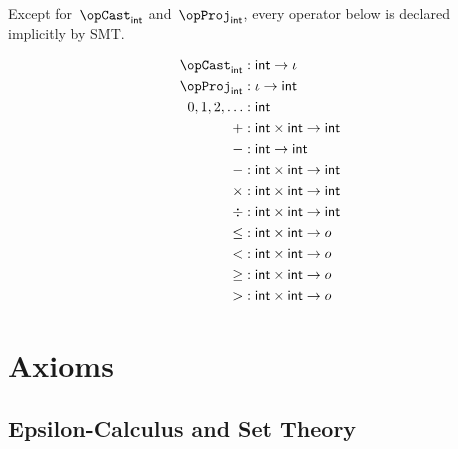 \documentclass[11pt, a4paper, oneside]{article}
\begin{document}
Except for~$\opCast_\int$ and~$\opProj_\int$, every operator below is declared implicitly by SMT.

\begin{align*}
    \opCast_\int    &: \int \arr \idv \\
    \opProj_\int    &: \idv \arr \int \\
    0,1,2,\dots     &: \int \\
    +               &: \int \times \int \arr \int \\
    -               &: \int \arr \int \\
    -               &: \int \times \int \arr \int \\
    \times          &: \int \times \int \arr \int \\
    \div            &: \int \times \int \arr \int \\
    \le             &: \int \times \int \arr o \\
    <               &: \int \times \int \arr o \\
    \ge             &: \int \times \int \arr o \\
    >               &: \int \times \int \arr o \\
\end{align*}


\newpage
\section{Axioms}
\label{sec:axioms}

    \subsection{Epsilon-Calculus and Set Theory}
    \label{subsec:epsilon_and_sets}
\end{document}

